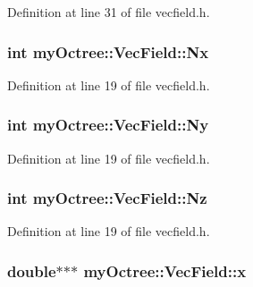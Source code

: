 Definition at line 31 of file vecfield.\+h.

\hypertarget{classmy_octree_1_1_vec_field_ae0d5070112c377b5e6ff475c04395e9c}{}
\subsubsection[{Nx}]{\setlength{\rightskip}{0pt plus 5cm}int my\+Octree\+::\+Vec\+Field\+::\+Nx}\label{classmy_octree_1_1_vec_field_ae0d5070112c377b5e6ff475c04395e9c}


Definition at line 19 of file vecfield.\+h.

\hypertarget{classmy_octree_1_1_vec_field_a95aa5dbef9a5fc1bf48f40aa26e0d7fd}{}
\subsubsection[{Ny}]{\setlength{\rightskip}{0pt plus 5cm}int my\+Octree\+::\+Vec\+Field\+::\+Ny}\label{classmy_octree_1_1_vec_field_a95aa5dbef9a5fc1bf48f40aa26e0d7fd}


Definition at line 19 of file vecfield.\+h.

\hypertarget{classmy_octree_1_1_vec_field_ac2ba7ec87e8f1bb39844cd45ab054f95}{}
\subsubsection[{Nz}]{\setlength{\rightskip}{0pt plus 5cm}int my\+Octree\+::\+Vec\+Field\+::\+Nz}\label{classmy_octree_1_1_vec_field_ac2ba7ec87e8f1bb39844cd45ab054f95}


Definition at line 19 of file vecfield.\+h.

\hypertarget{classmy_octree_1_1_vec_field_aa2f76e1e3ee56d0a54d42cf959354bc9}{}
\subsubsection[{x}]{\setlength{\rightskip}{0pt plus 5cm}double$\ast$$\ast$$\ast$ my\+Octree\+::\+Vec\+Field\+::x}\label{classmy_octree_1_1_vec_field_aa2f76e1e3ee56d0a54d42cf959354bc9}


